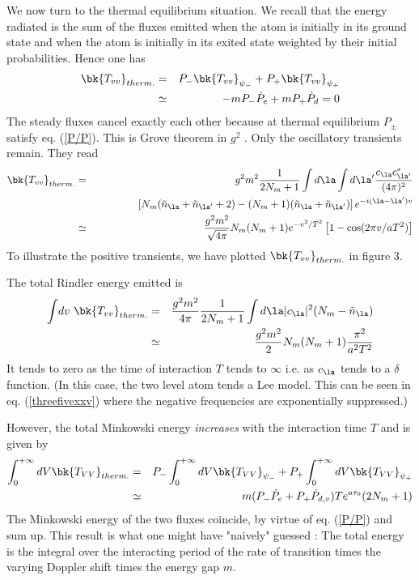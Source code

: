 \documentclass[12pt]{article}
\begin{document}
We now turn to the thermal equilibrium situation.
We recall that the energy radiated is the sum of the fluxes
emitted when the atom is initially
in its ground state
and
when the atom is initially in its
exited state weighted by
their initial probabilities.
Hence one has
 \begin{eqnarray}
\bk{T_{vv}}_{therm.} &=&
P_-  \bk{T_{vv}}_{\psi_-} +  P_+  \bk{T_{vv}}_{\psi_+}
 \nonumber\\ &\simeq&
-m P_-  \dot P_{e} + m P_+  \dot P_{d} =  0
\label{rayxx}
\end{eqnarray}
The steady fluxes cancel exactly each other because at thermal
equilibrium $P_{\pm}$ satisfy eq. (\ref{P/P}).
This is Grove theorem in $g^2$ \cite{Grove,mpbrsg}.
 Only the oscillatory transients remain.
They read
\begin{eqnarray}
 \bk{T_{vv}}_{therm.} &=&  g^2 m^2
{1 \over 2 N_m +1}
  \int d\la \int d\la^\prime  {c_\la
c_{\la^\prime}^*
 \over (4 \pi)^2}
\nonumber\\
&\ &\quad\quad
\quad\quad
\left[
N_m ( \tilde n_\la +\tilde n_{\la^\prime} + 2 )
- ( N_m + 1)  (\tilde n_\la +\tilde n_{\la^\prime} )
\right ]
e^{-i(\la- \la^\prime) v}
\nonumber\\
 &\simeq&  {g^2 m^2 \over  \sqrt{4 \pi}}
N_m ( N_m + 1) e^{-v^2/T^2} \left[
1 - \cos (2 \pi v/ aT^2)\right ]
\label{rayxxi}
\end{eqnarray}
 To illustrate the positive transients, we have plotted
$\bk{T_{vv}}_{therm.}$ in figure 3.

The total Rindler
energy emitted is
\begin{eqnarray}
 \int\! dv\ \bk{T_{vv}}_{therm.}&=&
{ g^2 m^2
\over 4 \pi}{1 \over 2 N_m + 1}
 \int d\la \vert c_\la \vert^2 (N_m - \tilde n_\la )\nonumber\\
&\simeq& {g^2 m^2 \over  2} N_m ( N_m + 1) { \pi^2 \over a^2 T^2}
\label{rayxxii}
\end{eqnarray}
It tends to zero
 as the time of interaction $T$
tends to $\infty$ i.e. as $c_\la$ tends to a $\delta$ function.
(In this case, the two level atom tends a Lee model. This can be seen
in eq. (\ref{threefivexxv}) where the negative frequencies are exponentially
suppressed.)

However, the total Minkowski energy
{\it increases}
with the interaction time $T$ and is
given by
 \begin{eqnarray} \int^{+\infty}_0 dV \bk{T_{VV}}_{therm.} &=&
P_-  \int^{+\infty}_0 dV \bk{T_{VV}}_{\psi_-} +  P_+
\int^{+\infty}_0 dV \bk{T_{VV}}_{\psi_+}
\nonumber\\ &\simeq&
m( P_-  \dot P_{e} + P_+  \dot P_{d,v}) T e^{a \tau_0}(2 N_m + 1)
\label{rayxxiii}
\end{eqnarray}
The Minkowski energy of the two fluxes coincide, by virtue of
eq. (\ref{P/P}) and sum up.
This result is what one might have "naively" guessed :
The total energy is the integral over the interacting period
of the rate of transition times the varying Doppler shift
times the energy gap $m$.
\end{document}
